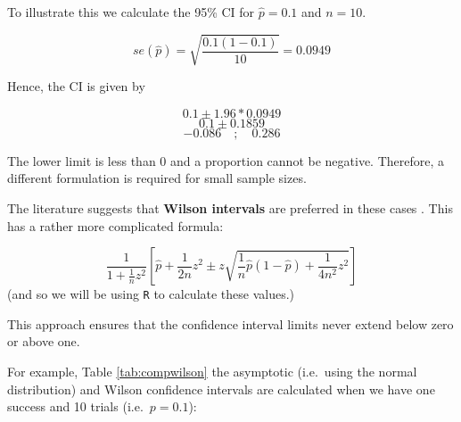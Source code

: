 \documentclass[
  oneside]{krantz}
\begin{document}
To illustrate this we calculate the 95\% CI for \(\hat p=0.1\) and \(n=10\).

\[se(\hat p) = \sqrt{\frac{0.1 (1-0.1)}{10}} = 0.0949\]

Hence, the CI is given by

\[0.1 \pm 1.96*0.0949\]
\[0.1 \pm 0.1859 \]
\[-0.086 \quad ; \quad 0.286 \]

The lower limit is less than 0 and a proportion cannot be negative. Therefore, a different formulation is required for small sample sizes.

The literature suggests that \textbf{Wilson intervals} are preferred in these cases \citep{Agresti1998}. This has a rather more complicated formula:

\[\frac{1}{1+{\frac{1}{n}}z^{2}}\left[{\hat {p}}+{\frac{1}{2n}}z^{2}\pm z{\sqrt{{\frac {1}{n}}{\hat{p}}\left(1-{\hat{p}}\right)+{\frac {1}{4n^{2}}}z^{2}}}\right]\]
(and so we will be using \texttt{R} to calculate these values.)

This approach ensures that the confidence interval limits never extend below zero or above one.

For example, Table \ref{tab:compwilson} the asymptotic (i.e.~using the normal distribution) and Wilson confidence intervals are calculated when we have one success and 10 trials (i.e.~\(p=0.1\)):
\end{document}
